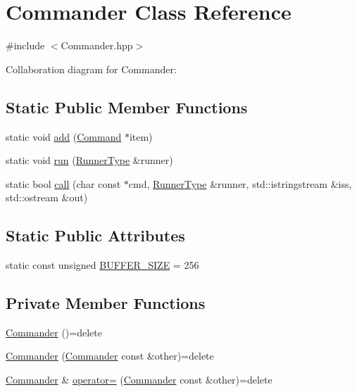 \hypertarget{classCommander}{}\section{Commander Class Reference}
\label{classCommander}


{\ttfamily \#include $<$Commander.\+hpp$>$}



Collaboration diagram for Commander\+:
\subsection*{Static Public Member Functions}
\begin{DoxyCompactItemize}
\item 
static void \hyperlink{classCommander_a467f6a4ceeb5dab750cf3f4821b5db90}{add} (\hyperlink{classCommand}{Command} $\ast$item)
\item 
static void \hyperlink{classCommander_afea1bfe2bc8dbeea0d0523f369c9539e}{run} (\hyperlink{Command_8hpp_a3594ceaf3c835811a9a67810e7af19f9}{Runner\+Type} \&runner)
\item 
static bool \hyperlink{classCommander_a28323e9560f01aba51869d54832ca987}{call} (char const $\ast$cmd, \hyperlink{Command_8hpp_a3594ceaf3c835811a9a67810e7af19f9}{Runner\+Type} \&runner, std\+::istringstream \&iss, std\+::ostream \&out)
\end{DoxyCompactItemize}
\subsection*{Static Public Attributes}
\begin{DoxyCompactItemize}
\item 
static const unsigned \hyperlink{classCommander_a9e1b32d844b2d8080e51c4e8a4ca0442}{B\+U\+F\+F\+E\+R\+\_\+\+S\+I\+ZE} = 256
\end{DoxyCompactItemize}
\subsection*{Private Member Functions}
\begin{DoxyCompactItemize}
\item 
\hyperlink{classCommander_accd2048a7f1b8aa3a2b362493d546495}{Commander} ()=delete
\item 
\hyperlink{classCommander_aaf951ebc1b2909dbdccfb3ab7bd80b0d}{Commander} (\hyperlink{classCommander}{Commander} const \&other)=delete
\item 
\hyperlink{classCommander}{Commander} \& \hyperlink{classCommander_a505015f2c954a48742acec695d1559dc}{operator=} (\hyperlink{classCommander}{Commander} const \&other)=delete
\end{DoxyCompactItemize}
